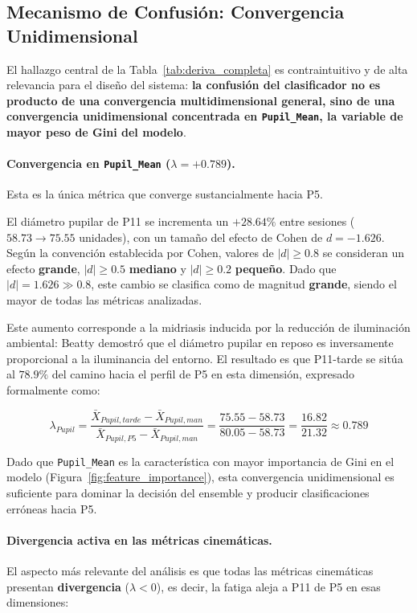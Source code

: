 \subsection{Mecanismo de Confusión: Convergencia Unidimensional}

El hallazgo central de la Tabla~\ref{tab:deriva_completa} es contraintuitivo
y de alta relevancia para el diseño del sistema: \textbf{la confusión del
	clasificador no es producto de una convergencia multidimensional general,
	sino de una convergencia unidimensional concentrada en \texttt{Pupil\_Mean},
	la variable de mayor peso de Gini del modelo}.
\paragraph{Convergencia en \texttt{Pupil\_Mean} ($\lambda = +0.789$).}
Esta es la única métrica que converge sustancialmente hacia P5.

El diámetro pupilar de P11 se incrementa un $\mathbf{+28.64\%}$ entre sesiones ($58.73 \to 75.55$ unidades), con un tamaño del efecto de Cohen \cite{cohen1988statistical} de $d = -1.626$. Según la convención establecida por Cohen, valores de $|d| \geq 0.8$ se consideran un efecto \textbf{grande}, $|d| \geq 0.5$ \textbf{mediano} y $|d| \geq 0.2$ \textbf{pequeño}. Dado que $|d| = 1.626 \gg 0.8$, este cambio se clasifica como de magnitud \textbf{grande}, siendo el mayor de todas las métricas analizadas.

Este aumento corresponde a la midriasis inducida por la
reducción de iluminación ambiental: Beatty \cite{beatty1982} demostró
que el diámetro pupilar en reposo es inversamente proporcional a la
iluminancia del entorno.
El resultado es que P11-tarde se sitúa al
$78.9\%$ del camino hacia el perfil de P5 en esta dimensión,
expresado formalmente como:

\begin{equation}
	\lambda_{Pupil} =
	\frac{\bar{X}_{Pupil,tarde} - \bar{X}_{Pupil,man}}
	{\bar{X}_{Pupil,P5}   - \bar{X}_{Pupil,man}}
	= \frac{75.55 - 58.73}{80.05 - 58.73} = \frac{16.82}{21.32}
	\approx 0.789
	\label{eq:lambda_pupil_num}
\end{equation}

Dado que \texttt{Pupil\_Mean} es la característica con mayor importancia
de Gini en el modelo (Figura~\ref{fig:feature_importance}), esta
convergencia unidimensional es suficiente para dominar la decisión del
ensemble y producir clasificaciones erróneas hacia P5.
\paragraph{Divergencia activa en las métricas cinemáticas.}
El aspecto más relevante del análisis es que todas las métricas
cinemáticas presentan \textbf{divergencia} ($\lambda < 0$), es decir,
la fatiga aleja a P11 de P5 en esas dimensiones:


